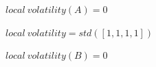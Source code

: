 \documentclass[oneside,12pt]{Classes/RoboticsLaTeX}
\begin{document}
\begin{appendices}
\begin{center}
$local\ volatility(A) = 0$

$local\ volatility = std([1,1,1,1])$

$local\ volatility(B) = 0$
\end{center}







\end{appendices}
\end{document}
